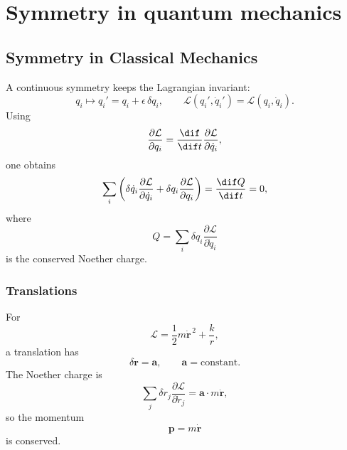 \section{Symmetry in quantum mechanics}


\subsection{Symmetry in Classical Mechanics}

A continuous symmetry keeps the Lagrangian invariant:
\begin{equation}
 q_i\longmapsto q_i'=q_i+\epsilon\,\delta q_i,
 \qquad
 \mathcal L(q_i',\dot q_i')=\mathcal L(q_i,\dot q_i).
\end{equation}
Using
\begin{equation}
 \frac{\partial\mathcal L}{\partial q_i}
 =\frac{\dif}{\dif t}
 \frac{\partial\mathcal L}{\partial\dot q_i},
\end{equation}
one obtains
\begin{equation}
 \sum_i\left(
 \delta\dot q_i\frac{\partial\mathcal L}{\partial\dot q_i}
 +\delta q_i\frac{\partial\mathcal L}{\partial q_i}
 \right)
 =\frac{\dif Q}{\dif t}=0,
\end{equation}
where
\begin{equation}
 \boxed{Q=\sum_i\delta q_i
 \frac{\partial\mathcal L}{\partial\dot q_i}}
\end{equation}
is the conserved Noether charge.

\subsubsection{Translations}
For
\begin{equation}
 \mathcal L=\frac12m\dot{\bm r}^{\,2}+\frac{k}{r},
\end{equation}
a translation has
\begin{equation}
 \delta\bm r=\bm a,
 \qquad \bm a=\text{constant}.
\end{equation}
The Noether charge is
\begin{equation}
 \sum_j\delta r_j\frac{\partial\mathcal L}{\partial\dot r_j}
 =\bm a\cdot m\dot{\bm r},
\end{equation}
so the momentum
\begin{equation}
 \boxed{\bm p=m\dot{\bm r}}
\end{equation}
is conserved.

